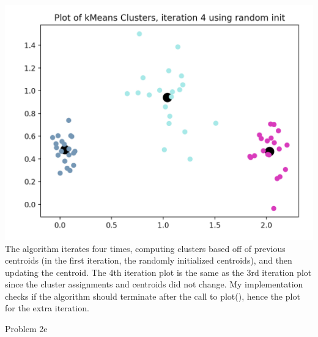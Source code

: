 \documentclass[11pt]{article}
\begin{document}
{\includegraphics[scale = 0.5]{kmeans-rand-iter-4.png} \newline{}
The algorithm iterates four times, computing clusters based off of previous centroids (in the first iteration, the randomly initialized centroids), and then updating the centroid. The 4th iteration plot is the same as the 3rd iteration plot since the cluster assignments and centroids did not change. My implementation checks if the algorithm should terminate after the call to plot(), hence the plot for the extra iteration. 
}

\item Problem 2e
\end{document}
